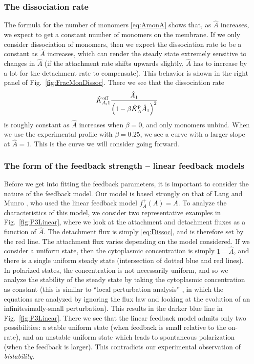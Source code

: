 \documentclass[11pt]{article}
\newcommand{\6}[1]{#1_{\text{6}}}
\newcommand{\3}[1]{#1_{\text{3}}}
\begin{document}
\subsubsection{The dissociation rate}
The formula for the number of monomers \eqref{eq:AmonA} shows that, as $\hat A$ increases, we expect to get a constant number of monomers on the membrane. If we only consider dissociation of monomers, then we expect the dissociation rate to be a constant as $\hat A$ increases, which can render the steady state extremely sensitive to changes in $\hat A$ (if the attachment rate shifts upwards slightly, $\hat A$ has to increase by a lot for the detachment rate to compensate). This behavior is shown in the right panel of Fig.\ \ref{fig:FracMonDissoc}. There we see that the dissociation rate 
\begin{equation}
\label{eq:Dissoc}
\hat{K}^\text{off}_{A,1}  \frac{\hat A_1}{\left(1-\beta \hat{K}^\text{p}_A \hat A_1\right)^2}
\end{equation}
is roughly constant as $\hat A$ increases when $\beta=0$, and only monomers unbind. When we use the experimental profile with $\beta=0.25$, we see a curve with a larger slope at $\hat A=1$. This is the curve we will consider going forward.

\subsubsection{The form of the feedback strength -- linear feedback models}
Before we get into fitting the feedback parameters, it is important to consider the nature of the feedback model. Our model is based strongly on that of Lang and Munro \cite{lang2022oligomerization}, who used the linear feedback model $f_A^+(A)=A.$
To analyze the characteristics of this model, we consider two representative examples in Fig.\ \ref{fig:P3Linear}, where we look at the attachment and detachment fluxes as a function of $\hat A$. The detachment flux is simply \eqref{eq:Dissoc}, and is therefore set by the red line. The attachment flux varies depending on the model considered. If we consider a uniform state, then the cytoplasmic concentration is simply $1-\hat A$, and there is a single uniform steady state (intersection of dotted blue and red lines). In polarized states, the concentration is not necessarily uniform, and so we analyze the stability of the steady state by taking the cytoplasmic concentration as constant (this is similar to ``local perturbation analysis'' \cite{holmes2015local}, in which the equations are analyzed by ignoring the flux law and looking at the evolution of an infinitesimally-small perturbation). This results in the darker blue line in Fig.\ \ref{fig:P3Linear}. There we see that the linear feedback model admits only two possibilities: a stable uniform state (when feedback is small relative to the on-rate), and an unstable uniform state which leads to spontaneous polarization (when the feedback is larger). This contradicts our experimental observation of \emph{bistability}.
\end{document}
